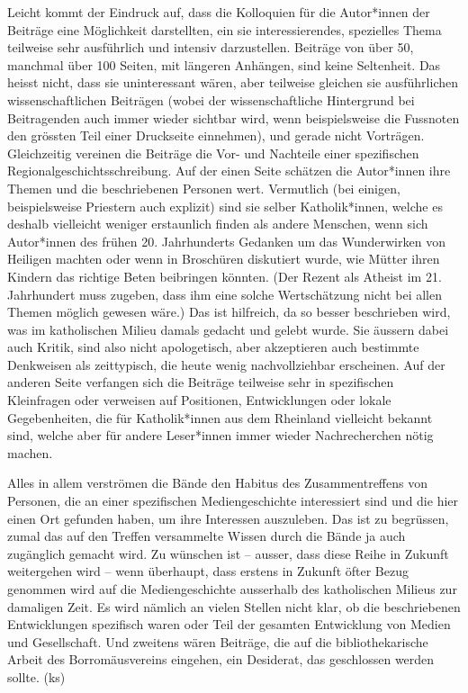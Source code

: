 \documentclass[a4paper,
fontsize=11pt,
oneside,
numbers=noperiodatend,
parskip=half-,
bibliography=totoc,
final
]{scrartcl}
\begin{document}
Leicht kommt der Eindruck auf, dass die Kolloquien für die Autor*innen
der Beiträge eine Möglichkeit darstellten, ein sie interessierendes,
spezielles Thema teilweise sehr ausführlich und intensiv darzustellen.
Beiträge von über 50, manchmal über 100 Seiten, mit längeren Anhängen,
sind keine Seltenheit. Das heisst nicht, dass sie uninteressant wären,
aber teilweise gleichen sie ausführlichen wissenschaftlichen Beiträgen
(wobei der wissenschaftliche Hintergrund bei Beitragenden auch immer
wieder sichtbar wird, wenn beispielsweise die Fussnoten den grössten
Teil einer Druckseite einnehmen), und gerade nicht Vorträgen.
Gleichzeitig vereinen die Beiträge die Vor- und Nachteile einer
spezifischen Regionalgeschichtsschreibung. Auf der einen Seite schätzen
die Autor*innen ihre Themen und die beschriebenen Personen wert.
Vermutlich (bei einigen, beispielsweise Priestern auch explizit) sind
sie selber Katholik*innen, welche es deshalb vielleicht weniger
erstaunlich finden als andere Menschen, wenn sich Autor*innen des frühen
20. Jahrhunderts Gedanken um das Wunderwirken von Heiligen machten oder
wenn in Broschüren diskutiert wurde, wie Mütter ihren Kindern das
richtige Beten beibringen könnten. (Der Rezent als Atheist im 21.
Jahrhundert muss zugeben, dass ihm eine solche Wertschätzung nicht bei
allen Themen möglich gewesen wäre.) Das ist hilfreich, da so besser
beschrieben wird, was im katholischen Milieu damals gedacht und gelebt
wurde. Sie äussern dabei auch Kritik, sind also nicht apologetisch, aber
akzeptieren auch bestimmte Denkweisen als zeittypisch, die heute wenig
nachvollziehbar erscheinen. Auf der anderen Seite verfangen sich die
Beiträge teilweise sehr in spezifischen Kleinfragen oder verweisen auf
Positionen, Entwicklungen oder lokale Gegebenheiten, die für
Katholik*innen aus dem Rheinland vielleicht bekannt sind, welche aber
für andere Leser*innen immer wieder Nachrecherchen nötig machen.

Alles in allem verströmen die Bände den Habitus des Zusammentreffens von
Personen, die an einer spezifischen Mediengeschichte interessiert sind
und die hier einen Ort gefunden haben, um ihre Interessen auszuleben.
Das ist zu begrüssen, zumal das auf den Treffen versammelte Wissen durch
die Bände ja auch zugänglich gemacht wird. Zu wünschen ist -- ausser,
dass diese Reihe in Zukunft weitergehen wird -- wenn überhaupt, dass
erstens in Zukunft öfter Bezug genommen wird auf die Mediengeschichte
ausserhalb des katholischen Milieus zur damaligen Zeit. Es wird nämlich
an vielen Stellen nicht klar, ob die beschriebenen Entwicklungen
spezifisch waren oder Teil der gesamten Entwicklung von Medien und
Gesellschaft. Und zweitens wären Beiträge, die auf die bibliothekarische
Arbeit des Borromäusvereins eingehen, ein Desiderat, das geschlossen
werden sollte. (ks)
\end{document}
